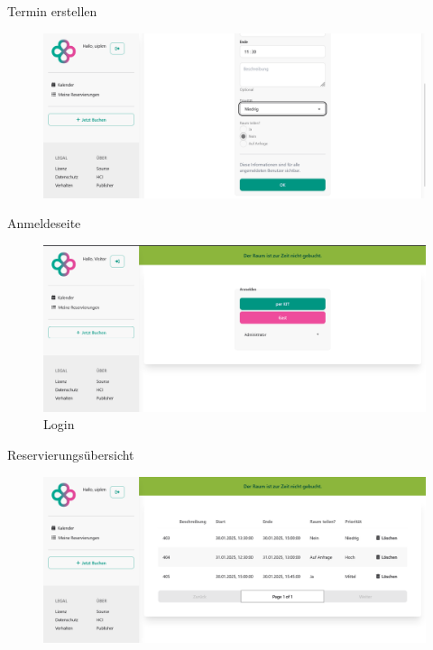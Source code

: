 \documentclass{sdqbeamer}
\begin{document}
    \begin{frame}{Termin erstellen}
        \thispagestyle{plain}
        \begin{figure}
            \centering
            \includegraphics[width=1\linewidth]{bookings_create_form_2.png}
            \label{fig:enter-label}
        \end{figure}
    \end{frame}
    
    \begin{frame}{Anmeldeseite}
        \thispagestyle{plain}
        \begin{figure}
            \centering
            \includegraphics[width=1\linewidth]{auth_login.png}
            \caption{Login}
            \label{fig:enter-label}
        \end{figure}
    \end{frame}
    
    \begin{frame}{Reservierungsübersicht}
        \thispagestyle{plain}
        \begin{figure}
            \centering
            \includegraphics[width=1\linewidth]{bookings_list.png}
            \label{fig:enter-label}
        \end{figure}
    \end{frame}
    
\end{document}
